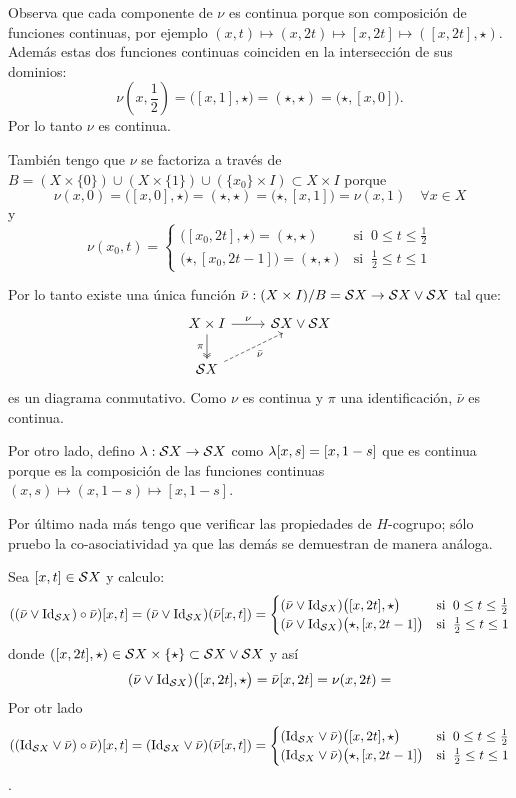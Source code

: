 \documentclass[../../topologia_algebraica]{subfiles}
\begin{document}
Observa que cada componente de $\nu$ es continua porque son composici\'on de funciones
continuas, por ejemplo $(x,t)\mapsto(x,2t)\mapsto[x,2t]\mapsto([x,2t],\star)$. Adem\'as estas dos
funciones continuas coinciden en la intersecci\'on de sus dominios:
\[
  \nu(x,\frac{1}{2})=\big([x,1],\star\big)=(\star,\star)=\big(\star,[x,0]\big).
\]
Por lo tanto $\nu$ es continua.

Tambi\'en tengo que $\nu$ se factoriza a trav\'es de
$B=(X\times\{0\})\cup(X\times\{1\})\cup(\{x_0\}\times I)\subset X\times I$ porque
\[
  \nu(x,0)=\big( [x,0],\star \big)=(\star,\star)=\big(\star,[x,1]\big)=\nu(x,1) \quad\forall x\in X
\]
y
\[
  \nu(x_0,t)=
  \begin{cases}
    \big( [x_0,2t],\star \big)=(\star,\star) &\text{si}\;\; 0\leq t\leq\frac{1}{2} \\
    \big( \star,[x_0,2t-1] \big)=(\star,\star) &\text{si}\;\; \frac{1}{2}\leq t\leq 1 
  \end{cases}
\]

Por lo tanto existe una \'unica funci\'on $\bar{\nu}:(X\times I)/B=\mathcal{S} X\rightarrow\mathcal{S} X\vee\mathcal{S} X$ tal que:
\[
  \begin{tikzcd}
    X\times I \arrow[r,"\nu"] \arrow[d,two heads,"\pi"'] & \Ss X \vee \Ss X \\
    \Ss X \arrow[ur,dashed,"\bar{\nu}"']
  \end{tikzcd}
\]
es un diagrama conmutativo. Como $\nu$ es continua y $\pi$ una identificaci\'on, $\bar{\nu}$ es
continua.

Por otro lado, defino $\lambda:\mathcal{S} X \rightarrow \mathcal{S} X$ como $\lambda[x,s]=[x,1-s]$ que es continua porque es la
composici\'on de las funciones continuas $(x,s)\mapsto(x,1-s)\mapsto[x,1-s]$.

Por \'ultimo nada m\'as tengo que verificar las propiedades de $H$-cogrupo; s\'olo pruebo la
co-asociatividad ya que las dem\'as se demuestran de manera an\'aloga.

Sea $[x,t]\in \mathcal{S} X$ y calculo:
\[
  ((\bar{\nu}\vee\text{Id}_{\mathcal{S} X})\circ\bar{\nu})[x,t] =(\bar{\nu}\vee\text{Id}_{\mathcal{S} X})(\bar{\nu}[x,t])=
  \begin{cases}
    (\bar{\nu}\vee\text{Id}_{\mathcal{S} X})\big([x,2t],\star \big) & \text{si}\;\; 0\leq t\leq\frac{1}{2} \\
    (\bar{\nu}\vee\text{Id}_{\mathcal{S} X})\big(\star,[x,2t-1] \big) & \text{si}\;\; \frac{1}{2}\leq t\leq 1
  \end{cases}
\]
donde $([x,2t],\star)\in\mathcal{S} X\times\{\star\}\subset\mathcal{S} X\vee\mathcal{S} X$ y as\'i
\[
  (\bar{\nu}\vee\text{Id}_{\mathcal{S} X})\big( [x,2t],\star  \big)=\bar{\nu}[x,2t]=\nu(x,2t)=
\]
Por otr lado
\[
  ((\text{Id}_{\mathcal{S} X}\vee\bar{\nu})\circ\bar{\nu})[x,t] =(\text{Id}_{\mathcal{S} X}\vee\bar{\nu})(\bar{\nu}[x,t])=
  \begin{cases}
    (\text{Id}_{\mathcal{S} X}\vee\bar{\nu})\big([x,2t],\star \big) & \text{si}\;\; 0\leq t\leq\frac{1}{2} \\
    (\text{Id}_{\mathcal{S} X}\vee\bar{\nu})\big(\star,[x,2t-1] \big) & \text{si}\;\; \frac{1}{2}\leq t\leq 1
  \end{cases}
\]
.
\end{document}
